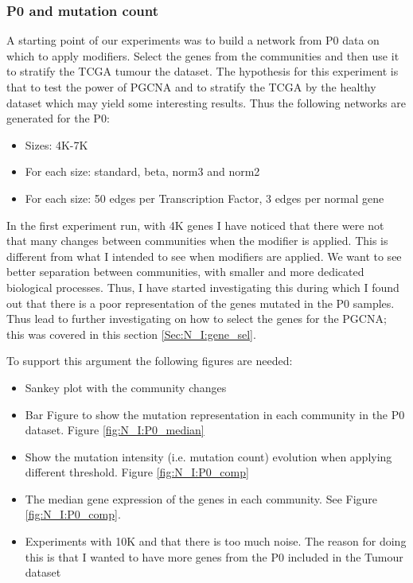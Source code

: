 

\subsubsection{P0 and mutation count}

A starting point of our experiments was to build a network from P0 data on which to apply modifiers. Select the genes from the communities and then use it to stratify the TCGA tumour the dataset. The hypothesis for this experiment is that to test the power of PGCNA and to stratify the TCGA by the healthy dataset which may yield some interesting results. Thus the following networks are generated for the P0:

\begin{itemize}
    \item Sizes: 4K-7K
    \item For each size: standard, beta, norm3 and norm2
    \item For each size: 50 edges per Transcription Factor, 3 edges per normal gene
\end{itemize}


In the first experiment run, with 4K genes I have noticed that there were not that many changes between communities when the modifier is applied. This is different from what I intended to see when modifiers are applied. We want to see better separation between communities, with smaller and more dedicated biological processes. Thus, I have started investigating this during which I found out that there is a poor representation of the genes mutated in the P0 samples. Thus lead to further investigating on how to select the genes for the PGCNA; this was covered in this section \ref{Sec:N_I:gene_sel}.

To support this argument the following figures are needed:
\begin{itemize}
    \item Sankey plot with the community changes
    \item Bar Figure to show the mutation representation in each community in the P0 dataset. Figure \ref{fig:N_I:P0_median}
    \item Show the mutation intensity (i.e. mutation count) evolution when applying different threshold.  Figure \ref{fig:N_I:P0_comp}
    \item The median gene expression of the genes in each community. See Figure \ref{fig:N_I:P0_comp}.
    \item Experiments with 10K and that there is too much noise. The reason for doing this is that I wanted to have more genes from the P0 included in the Tumour dataset
\end{itemize}

